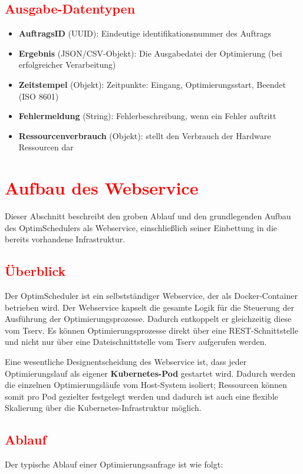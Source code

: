 \documentclass[
    12pt,               
    a4paper,            
    ngerman,            
    parskip=half,       
    headings=normal,   
    numbers=enddot,     
    toc=chapterentrywithdots 
]{scrreprt}\usepackage[utf8]{inputenc}
\begin{document}
\subsection{\textcolor{red}{Ausgabe-Datentypen}}
\begin{itemize}
    \item \textbf{AuftragsID} (UUID): Eindeutige identifikationsnummer des Auftrags
    \item \textbf{Ergebnis} (JSON/CSV-Objekt): Die Ausgabedatei der Optimierung (bei erfolgreicher Verarbeitung)
    \item \textbf{Zeitstempel} (Objekt): Zeitpunkte: Eingang, Optimierungsstart, Beendet (ISO 8601)
    \item \textbf{Fehlermeldung} (String): Fehlerbeschreibung, wenn ein Fehler auftritt
    \item \textbf{Ressourcenverbrauch} (Objekt): stellt den Verbrauch der Hardware Ressourcen dar
\end{itemize}

\section{\textcolor{red}{Aufbau des Webservice}}
Dieser Abschnitt beschreibt den groben Ablauf und den grundlegenden Aufbau des OptimSchedulers als Webservice, einschließlich seiner Einbettung in die bereits vorhandene Infrastruktur.

\subsection{\textcolor{red}{Überblick}}
Der OptimScheduler ist ein selbstständiger Webservice, der als Docker-Container betrieben wird. Der Webservice kapselt die gesamte Logik für die Steuerung der Ausführung der Optimierungsprozesse. Dadurch entkoppelt er gleichzeitig diese vom Tserv. Es können Optimierungsprozesse direkt über eine REST-Schnittstelle und nicht nur über eine Dateischnittstelle vom Tserv aufgerufen werden.

Eine wesentliche Designentscheidung des Webservice ist, dass jeder Optimierungslauf als eigener \textbf{Kubernetes-Pod} \citep[Vgl.]{kubernetes2024} gestartet wird. Dadurch werden die einzelnen Optimierungsläufe vom Host-System isoliert; Ressourcen können somit pro Pod gezielter festgelegt werden und dadurch ist auch eine flexible Skalierung über die Kubernetes-Infrastruktur möglich.

\subsection{\textcolor{red}{Ablauf}}
Der typische Ablauf einer Optimierungsanfrage ist wie folgt:
\end{document}
